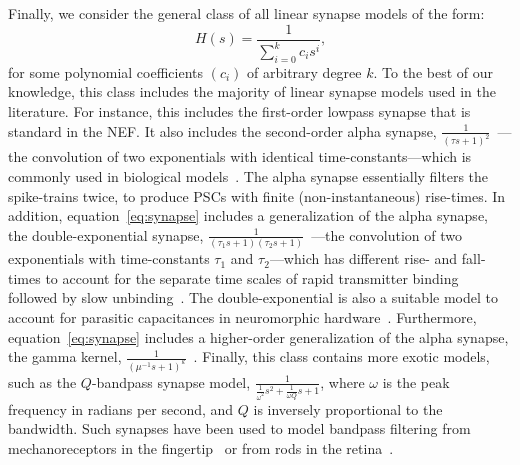 Finally, we consider the general class of all linear synapse models of the form:
\begin{equation} \label{eq:synapse}
H(s) = \frac{1}{\sum_{i=0}^k c_i s^i} \text{,}
\end{equation}
for some polynomial coefficients $\left( c_i \right)$ of arbitrary degree $k$.
To the best of our knowledge, this class includes the majority of linear synapse models used in the literature.
For instance, this includes the first-order lowpass synapse that is standard in the NEF.
It also includes the second-order alpha synapse, $\frac{1}{(\tau s + 1)^2}$~\citep{rall1967distinguishing}---the convolution of two exponentials with identical time-constants---which is commonly used in biological models~\citep{koch1989methods, destexhe1994synthesis, mainen1995reliability, destexhe1998kinetic, roth2009modeling}.
The alpha synapse essentially filters the spike-trains twice, to produce PSCs with finite (non-instantaneous) rise-times.
In addition, equation~\ref{eq:synapse} includes a generalization of the alpha synapse, the double-exponential synapse, $\frac{1}{(\tau_1 s + 1)(\tau_2 s + 1)}$~\citep{wilson1989simulation}---the convolution of two exponentials with time-constants $\tau_1$ and $\tau_2$---which has different rise- and fall-times to account for the separate time scales of rapid transmitter binding followed by slow unbinding~\citep{destexhe1994synthesis, hausser1997estimating, roth2009modeling}.
The double-exponential is also a suitable model to account for parasitic capacitances in neuromorphic hardware~\citep{voelker2017iscas}.
Furthermore, equation~\ref{eq:synapse} includes a higher-order generalization of the alpha synapse, the gamma kernel, $\frac{1}{(\mu^{-1} s + 1)^k}$~\citep[][equation 19]{de1992gamma}. 
Finally, this class contains more exotic models, such as the $Q$-bandpass synapse model, $\frac{1}{\frac{1}{\omega^2}s^2 + \frac{1}{\omega Q}s + 1}$, where $\omega$ is the peak frequency in radians per second, and $Q$ is inversely proportional to the bandwidth.
Such synapses have been used to model bandpass filtering from mechanoreceptors in the fingertip~\citep{voelker2016a} or from rods in the retina~\citep{armstrong2003bandpass}.

